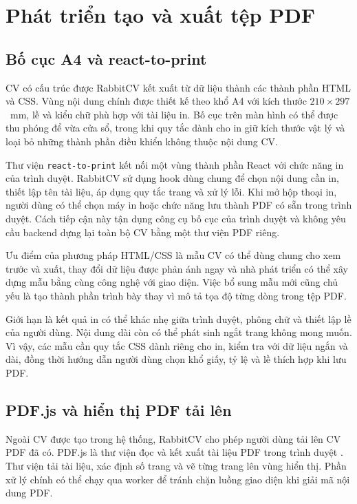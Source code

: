 \section{Phát triển tạo và xuất tệp PDF}

\subsection{Bố cục A4 và react-to-print}

CV có cấu trúc được RabbitCV kết xuất từ dữ liệu thành các thành phần HTML và CSS. Vùng nội dung chính được thiết kế theo khổ A4 với kích thước $210 \times 297$~mm, lề và kiểu chữ phù hợp với tài liệu in. Bố cục trên màn hình có thể được thu phóng để vừa cửa sổ, trong khi quy tắc dành cho in giữ kích thước vật lý và loại bỏ những thành phần điều khiển không thuộc nội dung CV.

Thư viện \texttt{react-to-print} kết nối một vùng thành phần React với chức năng in của trình duyệt. RabbitCV sử dụng hook dùng chung để chọn nội dung cần in, thiết lập tên tài liệu, áp dụng quy tắc trang và xử lý lỗi. Khi mở hộp thoại in, người dùng có thể chọn máy in hoặc chức năng lưu thành PDF có sẵn trong trình duyệt. Cách tiếp cận này tận dụng công cụ bố cục của trình duyệt và không yêu cầu backend dựng lại toàn bộ CV bằng một thư viện PDF riêng.

Ưu điểm của phương pháp HTML/CSS là mẫu CV có thể dùng chung cho xem trước và xuất, thay đổi dữ liệu được phản ánh ngay và nhà phát triển có thể xây dựng mẫu bằng cùng công nghệ với giao diện. Việc bổ sung mẫu mới cũng chủ yếu là tạo thành phần trình bày thay vì mô tả tọa độ từng dòng trong tệp PDF.

Giới hạn là kết quả in có thể khác nhẹ giữa trình duyệt, phông chữ và thiết lập lề của người dùng. Nội dung dài còn có thể phát sinh ngắt trang không mong muốn. Vì vậy, các mẫu cần quy tắc CSS dành riêng cho in, kiểm tra với dữ liệu ngắn và dài, đồng thời hướng dẫn người dùng chọn khổ giấy, tỷ lệ và lề thích hợp khi lưu PDF.

\subsection{PDF.js và hiển thị PDF tải lên}

Ngoài CV được tạo trong hệ thống, RabbitCV cho phép người dùng tải lên CV PDF đã có. PDF.js là thư viện đọc và kết xuất tài liệu PDF trong trình duyệt \cite{pdfjsdocs}. Thư viện tải tài liệu, xác định số trang và vẽ từng trang lên vùng hiển thị. Phần xử lý chính có thể chạy qua worker để tránh chặn luồng giao diện khi giải mã nội dung PDF.

